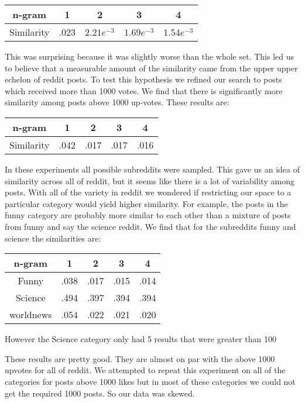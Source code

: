 \documentclass[12pt]{article}
\numberwithin{equation}{section}
\begin{document}
\begin{table}[h!]
	  \begin{tabular}{c | c c c c}
	  n-gram & 1 & 2 & 3 & 4\\
	  \hline
	  Similarity & .023 & $2.21e^{-3}$ & $1.69e^{-3}$ & $1.54e^{-3}$
	  \end{tabular}
	\end{table}
	This was surprising because it was slightly worse than the whole set.  This led us to believe that a measurable amount of the similarity came from the upper upper echelon of reddit posts.  To test this hypothesis we refined our search to posts which received more than 1000 votes.  We find that there is significantly more similarity among posts above 1000 up-votes.  These results are:\newline
	
	\begin{table}[h!]
	  \begin{tabular}{c | c c c c}
	  n-gram & 1 & 2 & 3 & 4\\
	  \hline
	  Similarity & .042 & .017 & .017 & .016
	  \end{tabular}
	\end{table}
	
	In these experiments all possible subreddits were sampled.  This gave us an idea of similarity across all of reddit, but it seems like there is a lot of variability among posts.  With all of the variety in reddit we wondered if restricting our space to a particular category would yield higher similarity.  For example, the posts in the funny category are probably more similar to each other than a mixture of posts from funny and say the science reddit.  We find that for the subreddits funny and science the similarities are:
	
		\begin{table}[h!]
	  \begin{tabular}{c | c c c c}
	  n-gram & 1 & 2 & 3 & 4\\
	  \hline
	  Funny & .038 & .017 & .015 & .014\\
	  Science & .494 & .397 & .394 & .394\\
	  worldnews & .054 & .022 & .021 & .020
	  \end{tabular}
	\end{table}
	However the Science category only had 5 results that were greater than 100
	
These results are pretty good.  They are almost on par with the above 1000 upvotes for all of reddit.   We attempted to repeat this experiment on all of the categories for posts above 1000 likes but in most of these categories we could not get the required 1000 posts.  So our data was skewed.  

	
	
	
\end{document}
